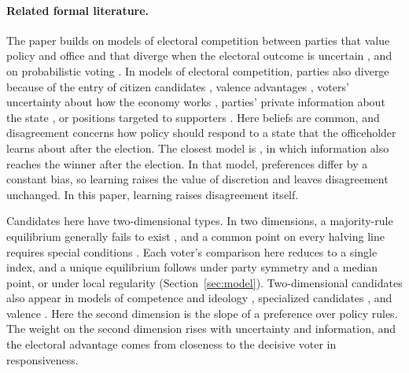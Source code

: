 \documentclass[12pt,letterpaper]{article}
\begin{document}
\paragraph{Related formal literature.}
The paper builds on models of electoral competition between parties that value policy and office and that diverge when the electoral outcome is uncertain \citep{Wittman1983,Calvert1985,Roemer2001}, and on probabilistic voting \citep{Lindbeck1987}. In models of electoral competition, parties also diverge because of the entry of citizen candidates \citep{OsborneSlivinski1996,BesleyCoate1997}, valence advantages \citep{Groseclose2001,Schofield2007}, voters' uncertainty about how the economy works \citep{Roemer1994}, parties' private information about the state \citep{Schultz1996}, or positions targeted to supporters \citep{GlaeserPonzettoShapiro2005}. Here beliefs are common, and disagreement concerns how policy should respond to a state that the officeholder learns about after the election. The closest model is \citet{KVW2017}, in which information also reaches the winner after the election. In that model, preferences differ by a constant bias, so learning raises the value of discretion and leaves disagreement unchanged. In this paper, learning raises disagreement itself.

Candidates here have two-dimensional types. In two dimensions, a majority-rule equilibrium generally fails to exist \citep{Plott1967,McKelvey1976}, and a common point on every halving line requires special conditions \citep{DavisDeGrootHinich1972,McKelvey1986}. Each voter's comparison here reduces to a single index, and a unique equilibrium follows under party symmetry and a median point, or under local regularity (Section~\ref{sec:model}). Two-dimensional candidates also appear in models of competence and ideology \citep{BernhardtCamaraSquintani2011}, specialized candidates \citep{KrasaPolborn2010}, and valence \citep{BuisseretVanWeelden2022}. Here the second dimension is the slope of a preference over policy rules. The weight on the second dimension rises with uncertainty and information, and the electoral advantage comes from closeness to the decisive voter in responsiveness.
\end{document}
